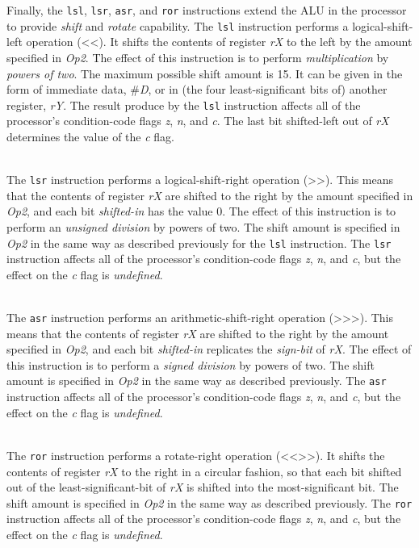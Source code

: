 \documentclass[epsfig,10pt,fullpage]{article} \addtolength{\textwidth}{1.5in}
\begin{document}
\noindent
Finally, the \texttt{lsl},
\texttt{lsr}, \texttt{asr}, and \texttt{ror} instructions extend the ALU in the processor to 
provide {\it shift} and {\it rotate} capability. The \texttt{lsl} instruction performs a
logical-shift-left operation (<\hspace{-.25mm}<). It shifts the
contents of register {\it rX} to the left by the amount specified in {\it Op2}. The effect
of this instruction is to perform {\it multiplication} by {\it powers of two}. The maximum 
possible shift amount is 15. It can be given in the form of immediate data, \#{\it D}, or in 
(the four least-significant bits of) another register, {\it rY}. The result produce by the
\texttt{lsl} instruction affects all of the processor's condition-code flags {\it z}, {\it n}, 
and {\it c}. The last bit shifted-left out of {\it rX} determines the value of the {\it c} flag. 

~\\
\noindent
The \texttt{lsr} instruction performs a logical-shift-right operation (>\hspace{-0.25mm}>).
This means that the
contents of register {\it rX} are shifted to the right by the amount specified in {\it Op2}, 
and each bit {\it shifted-in} has the value 0. The effect of this instruction is to
perform an {\it unsigned division} by powers of two. The shift amount is
specified in {\it Op2} in the same way as described previously for the \texttt{lsl} instruction. 
The \texttt{lsr} instruction affects all of the processor's condition-code flags 
{\it z}, {\it n}, and {\it c}, but the effect on the {\it c} flag is {\it undefined}.

~\\
\noindent
The \texttt{asr} instruction performs an arithmetic-shift-right operation 
(>\hspace{-0.25mm}>\hspace{-0.25mm}>). This means that the
contents of register {\it rX} are shifted to the right by the amount specified in {\it Op2}, 
and each bit {\it shifted-in} replicates the {\it sign-bit} of {\it rX}. The effect of 
this instruction is to perform a {\it signed division} by powers of two. The shift amount is
specified in {\it Op2} in the same way as described previously. The 
\texttt{asr} instruction affects all of the processor's condition-code flags {\it z}, {\it n}, 
and {\it c}, but the effect on the {\it c} flag is {\it undefined}.

~\\
\noindent
The \texttt{ror} instruction performs a rotate-right operation
(<\hspace{-0.25mm}<\hspace{-0.25mm}>\hspace{-0.25mm}>). It shifts the contents of
register {\it rX} to the right in a circular fashion, so that each bit shifted out of the
least-significant-bit of {\it rX} is shifted into the most-significant bit.  The shift amount is
specified in {\it Op2} in the same way as described previously. The 
\texttt{ror} instruction affects all of the processor's condition-code flags {\it z}, {\it n}, 
and {\it c}, but the effect on the {\it c} flag is {\it undefined}.
\end{document}

